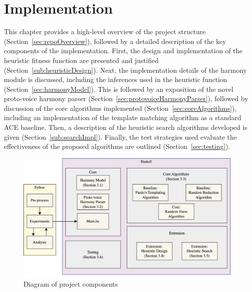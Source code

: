 \documentclass[12pt,a4paper,twoside,openany]{report} \usepackage[pdfborder={0 0 0}]{hyperref}    %
\theoremstyle{definition} \newtheorem{definition}{Definition}[section]
\begin{document}
    \label{sub:hardware}

    \chapter{Implementation}
    \label{chap:implementation}
    This chapter provides a high-level overview of the project structure (Section~\ref{sec:repoOverview}),
    followed by a detailed description of the key components of the implementation. 
    First, the design and implementation of the heuristic fitness function are presented and justified
    (Section~\ref{sub:heuristicDesign}). 
    Next, the implementation details of the harmony module is discussed, including the inferences used in
    the heuristic function (Section~\ref{sec:harmonyModel}). 
    This is followed by an exposition of the novel proto-voice harmony parser
    (Section~\ref{sec:protovoiceHarmonyParser}), followed by discussion of the core algorithms implemented (Section~\ref{sec:coreAlgorithms}), 
    including an implementation of the template matching algorithm \cite{pardoAlgorithmsChordalAnalysis2002} as
    a standard ACE baseline. 
    Then, a description of the heuristic search algorithms developed is given (Section~\ref{sub:searchImpl}). 
    Finally, the test strategies used evaluate the effectiveness of the proposed algorithms are outlined (Section~\ref{sec:testing}).

    \begin{figure}[ht] 
    \centering 
    \includegraphics[width=\textwidth]{figs/impl/blockDiag/DissBlockDiagram.png} 
    \caption{Diagram of project components} 
    \label{fig:blockDiagram} 
    \end{figure}
\end{document}
